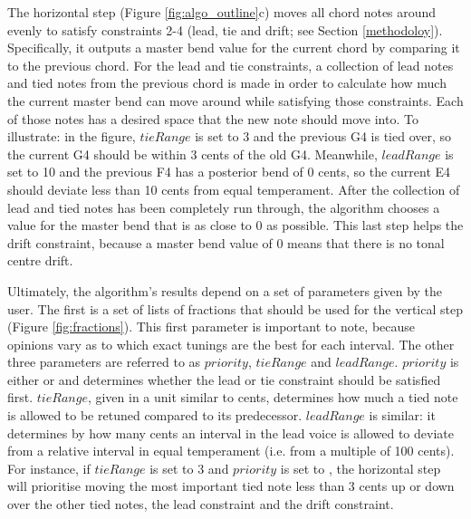 \documentclass[a4paper]{article}
\begin{document}
The horizontal step (Figure \ref{fig:algo_outline}c) moves all chord notes around evenly to satisfy constraints 2-4 (lead, tie and drift; see Section \ref{methodoloy}). Specifically, it outputs a master bend value for the current chord by comparing it to the previous chord. For the lead and tie constraints, a collection of lead notes and tied notes from the previous chord is made in order to calculate how much the current master bend can move around while satisfying those constraints. Each of those notes has a desired space that the new note should move into. To illustrate: in the figure, $\mathit{tieRange}$ is set to 3 and the previous G4 is tied over, so the current G4 should be within 3 cents of the old G4. Meanwhile, $\mathit{leadRange}$ is set to 10 and the previous F4 has a posterior bend of 0 cents, so the current E4 should deviate less than 10 cents from equal temperament. After the collection of lead and tied notes has been completely run through, the algorithm chooses a value for the master bend that is as close to 0 as possible. This last step helps the drift constraint, because a master bend value of 0 means that there is no tonal centre drift.

Ultimately, the algorithm's results depend on a set of parameters given by the user. The first is a set of lists of fractions that should be used for the vertical step (Figure \ref{fig:fractions}). This first parameter is important to note, because opinions vary as to which exact tunings are the best for each interval. The other three parameters are referred to as $\mathit{priority}$, $\mathit{tieRange}$ and $\mathit{leadRange}$. $\mathit{priority}$ is either  or  and determines whether the lead or tie constraint should be satisfied first. $\mathit{tieRange}$, given in a unit similar to cents, determines how much a tied note is allowed to be retuned compared to its predecessor. $\mathit{leadRange}$ is similar: it determines by how many cents an interval in the lead voice is allowed to deviate from a relative interval in equal temperament (i.e. from a multiple of 100 cents). For instance, if $\mathit{tieRange}$ is set to 3 and $\mathit{priority}$ is set to , the horizontal step will prioritise moving the most important tied note less than 3 cents up or down over the other tied notes, the lead constraint and the drift constraint.
\end{document}
